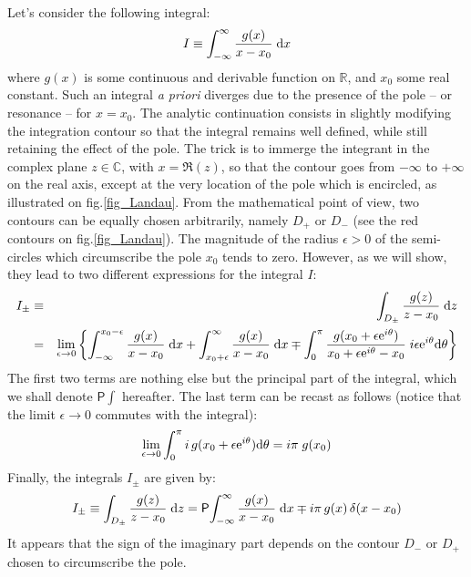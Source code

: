 \documentclass[11pt]{article}
\newcommand{\dd}{\textrm d}
\newcommand{\ee}{\textrm e}
\begin{document}
Let's consider the following integral:
\begin{equation}
  I \equiv \int_{-\infty}^{\infty} \frac{g(x)}{x-x_0}\; \dd x
\end{equation}
where $g(x)$ is some continuous and derivable function on $\mathbb{R}$, and $x_0$ some real constant. Such an integral \emph{a priori} diverges due to the presence of the pole -- or resonance -- for $x=x_0$. The analytic continuation consists in slightly modifying the integration contour so that the integral remains well defined, while still retaining the effect of the pole. The trick is to immerge the integrant in the complex plane $z\in \mathbb{C}$, with $x=\Re(z)$, so that the contour goes from $-\infty$ to $+\infty$ on the real axis, except at the very location of the pole which is encircled, as illustrated on fig.\ref{fig_Landau}. From the mathematical point of view, two contours can be equally chosen arbitrarily, namely $D_+$ or $D_-$ (see the red contours on fig.\ref{fig_Landau}). The magnitude of the radius $\epsilon>0$ of the semi-circles which circumscribe the pole $x_0$ tends to zero. However, as we will show, they lead to two different expressions for the integral $I$:
\begin{eqnarray*}
 I_{\pm} &\equiv& \int_{D_\pm} \frac{g(z)}{z-x_0}\; \dd z \\
   &=&
   \lim_{\epsilon\to0} \left\{
   \int_{-\infty}^{x_0-\epsilon} \frac{g(x)}{x-x_0}\; \dd x +
   \int_{x_0+\epsilon}^\infty \frac{g(x)}{x-x_0}\; \dd x
   \mp \int_0^{\pi} \frac{g(x_0+\epsilon\ee^{i\theta})}{x_0+\epsilon\ee^{i\theta}-x_0}\;
   i\epsilon\ee^{i\theta}\dd \theta \right\}
\end{eqnarray*}
The first two terms are nothing else but the principal part of the integral, which we shall denote $\mathsf{P}\!\int$ hereafter. The last term can be recast as follows (notice that the limit $\epsilon\to0$ commutes with the integral):
\begin{eqnarray*}
 \lim_{\epsilon\to0} \int_0^{\pi} i\, g(x_0+\epsilon\ee^{i\theta}) \dd \theta
   = i\pi\; g(x_0)
\end{eqnarray*}
Finally, the integrals $I_\pm$ are given by:
\begin{equation}
 I_{\pm} \equiv \int_{D_\pm} \frac{g(z)}{z-x_0}\; \dd z
 = \mathsf{P}\!\int_{-\infty}^{\infty} \frac{g(x)}{x-x_0}\; \dd x
       \mp i\pi\, g(x) \,\delta(x-x_0)
\end{equation}
It appears that the sign of the imaginary part depends on the contour $D_-$ or $D_+$ chosen to circumscribe the pole.
\end{document}

